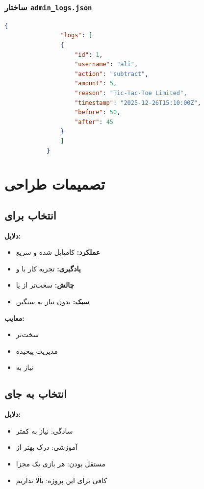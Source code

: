 \documentclass[12pt,a4paper]{article}
\begin{document}
	\subsubsection{ساختار \texttt{admin\_logs.json}}
	\begin{latin}
		\begin{lstlisting}[language=JSON, caption=ساختار admin\_logs.json]
			{
				"logs": [
				{
					"id": 1,
					"username": "ali",
					"action": "subtract",
					"amount": 5,
					"reason": "Tic-Tac-Toe Limited",
					"timestamp": "2025-12-26T15:10:00Z",
					"before": 50,
					"after": 45
				}
				]
			}
		\end{lstlisting}
	\end{latin}
	
	
	\newpage
	\section{تصمیمات طراحی}
	
	\subsection{انتخاب  برای }
	\textbf{دلایل:}
	\begin{itemize}
		\item \textbf{عملکرد:} کامپایل شده و سریع
		\item \textbf{یادگیری:} تجربه کار با  و 
		\item \textbf{چالش:} سخت‌تر از  یا 
		\item \textbf{سبک:} بدون نیاز به  سنگین
	\end{itemize}
	
	\textbf{معایب:}
	\begin{itemize}
		\item {} سخت‌تر
		\item مدیریت  پیچیده
		\item نیاز به 
	\end{itemize}
	
	\subsection{انتخاب  به جای }
	\textbf{دلایل:}
	\begin{itemize}
		\item سادگی: نیاز به  کمتر
		\item آموزشی: درک بهتر از 
		\item مستقل بودن: هر بازی یک  مجزا
		\item کافی برای این پروژه:  بالا نداریم
	\end{itemize}
	
\end{document}
